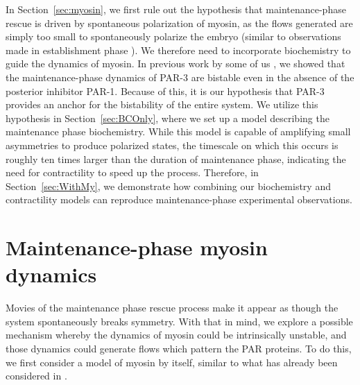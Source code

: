 \documentclass[11pt]{article}
\newcommand{\6}[1]{#1_{\text{6}}}
\newcommand{\3}[1]{#1_{\text{3}}}
\begin{document}
In Section\ \ref{sec:myosin}, we first rule out the hypothesis that maintenance-phase rescue is driven by spontaneous polarization of myosin, as the flows generated are simply too small to spontaneously polarize the embryo (similar to observations made in establishment phase \cite{nishikawa2017controlling}). We therefore need to incorporate biochemistry to guide the dynamics of myosin. In previous work by some of us \cite{lang2023oligomerization}, we showed that the maintenance-phase dynamics of PAR-3 are bistable even in the absence of the posterior inhibitor PAR-1. Because of this, it is our hypothesis that PAR-3 provides an anchor for the bistability of the entire system. We utilize this hypothesis in Section\ \ref{sec:BCOnly}, where we set up a model describing the maintenance phase biochemistry. While this model is capable of amplifying small asymmetries to produce polarized states, the timescale on which this occurs is roughly ten times larger than the duration of maintenance phase, indicating the need for contractility to speed up the process. Therefore, in Section\ \ref{sec:WithMy}, we demonstrate how combining our biochemistry and contractility models can reproduce maintenance-phase experimental observations.



\section{Maintenance-phase myosin dynamics \label{sec:myosin}}
Movies of the maintenance phase rescue process make it appear as though the system spontaneously breaks symmetry. With that in mind, we explore a possible mechanism whereby the dynamics of myosin could be intrinsically unstable, and those dynamics could generate flows which pattern the PAR proteins. To do this, we first consider a model of myosin by itself, similar to what has already been considered in \cite{bois2011pattern}. 
\end{document}
